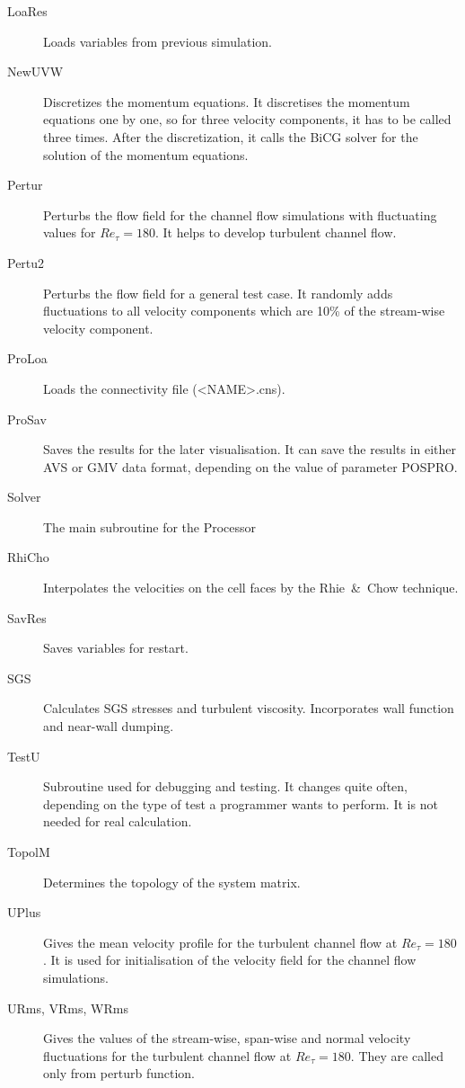 \documentclass[10pt]{article}
\newcommand*{\tc}{\ttfamily} %
\newcommand*{\tn}{\sffamily} %
\begin{document}
\begin{description}
    \item[\tc LoaRes] Loads variables from previous simulation.

    \item[\tc NewUVW] Discretizes the momentum equations. It
      discretises the momentum equations one by one, so for
      three velocity components, it has to be called three
      times. After the discretization, it calls the BiCG
      solver for the solution of the momentum equations. 

    \item[\tc Pertur] Perturbs the flow field for the channel
      flow simulations with fluctuating values for 
      $Re_{\tau}=180$. It helps to develop turbulent channel
      flow.

    \item[\tc Pertu2] Perturbs the flow field for a general
      test case. It randomly adds fluctuations to all velocity
      components which are 10\% of the stream-wise velocity
      component. 

    \item[\tc ProLoa] Loads the connectivity file ({\tc <NAME>.cns}). 

    \item[\tc ProSav] Saves the results for the later
      visualisation. It can save the results in either AVS
      or GMV data format, depending on the value of parameter
      {\tc POSPRO}.
 
    \item[\tc Solver] The main subroutine for the {\tn Processor}

    \item[\tc RhiCho] Interpolates the velocities on the cell
      faces by the \mbox{Rhie \& Chow} technique.

    \item[\tc SavRes] Saves variables for restart.

    \item[\tc SGS] Calculates SGS stresses and turbulent 
      viscosity. Incorporates wall function and near-wall
      dumping.

    \item[\tc TestU] Subroutine used for debugging and
      testing. It changes quite often, depending on the
      type of test a programmer wants to perform. It is
      not needed for real calculation.

    \item[\tc TopolM] Determines the topology of the system
      matrix.

    \item[\tc UPlus] Gives the mean velocity profile for
      the turbulent channel flow at $Re_{\tau}=180$. It is
      used for initialisation of the velocity field for the
      channel flow simulations.

    \item[\tc URms, VRms, WRms] Gives the values of the 
      stream-wise, span-wise and normal velocity fluctuations 
      for the turbulent channel flow at $Re_{\tau}=180$. They
      are called only from {\tc perturb} function.

    \end{description}
\end{document}
